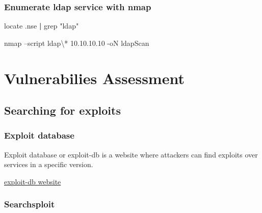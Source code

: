 \documentclass{assets/ipesethesis}
\newenvironment{Shaded}{\begin{snugshade}}{\end{snugshade}}
\newcommand{\DataTypeTok}[1]{\textcolor[rgb]{0.13,0.29,0.53}{#1}}
\newcommand{\FunctionTok}[1]{\textcolor[rgb]{0.00,0.00,0.00}{#1}}
\newcommand{\KeywordTok}[1]{\textcolor[rgb]{0.13,0.29,0.53}{\textbf{#1}}}
\newcommand{\NormalTok}[1]{#1}
\newcommand{\StringTok}[1]{\textcolor[rgb]{0.31,0.60,0.02}{#1}}
\begin{document}
\hypertarget{enumerate-ldap-service-with-nmap}{%
\section*{Enumerate ldap service with nmap}\label{enumerate-ldap-service-with-nmap}}

\begin{Shaded}
\begin{Highlighting}[]
\FunctionTok{locate}\NormalTok{ .nse }\KeywordTok{|} \FunctionTok{grep} \StringTok{"ldap"}
\end{Highlighting}
\end{Shaded}

\begin{Shaded}
\begin{Highlighting}[]
\FunctionTok{nmap}\NormalTok{ --script ldap}\DataTypeTok{\textbackslash{}*}\NormalTok{ 10.10.10.10 -oN ldapScan}
\end{Highlighting}
\end{Shaded}

\hypertarget{part-vulnerabilies-assessment}{%
\part{Vulnerabilies Assessment}\label{part-vulnerabilies-assessment}}

\hypertarget{searching-for-exploits}{%
\chapter*{Searching for exploits}\label{searching-for-exploits}}

\hypertarget{exploit-database}{%
\section*{Exploit database}\label{exploit-database}}

Exploit database or exploit-db is a website where attackers can find exploits over services in a specific version.

\href{https://www.exploit-db.com/}{exploit-db website}

\hypertarget{searchsploit}{%
\section*{Searchsploit}\label{searchsploit}}
\end{document}
